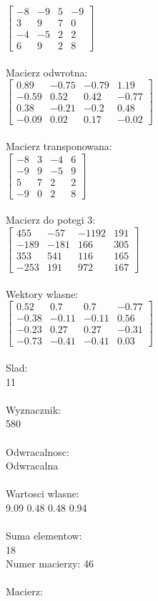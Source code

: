\documentclass[a4paper,12pt]{article}
\begin{document}
$\begin{bmatrix} -8&-9&5&-9\\3&9&7&0\\-4&-5&2&2\\6&9&2&8 \end{bmatrix}$
\\
\\
Macierz odwrotna:\\

$\begin{bmatrix} 0.89&-0.75&-0.79&1.19\\-0.59&0.52&0.42&-0.77\\0.38&-0.21&-0.2&0.48\\-0.09&0.02&0.17&-0.02 \end{bmatrix}$
\\
\\
Macierz transponowana:\\

$\begin{bmatrix} -8&3&-4&6\\-9&9&-5&9\\5&7&2&2\\-9&0&2&8 \end{bmatrix}$
\\
\\
Macierz do potegi 3:\\

$\begin{bmatrix} 455&-57&-1192&191\\-189&-181&166&305\\353&541&116&165\\-253&191&972&167 \end{bmatrix}$
\\
\\
Wektory wlasne:\\

$\begin{bmatrix} 0.52&0.7&0.7&-0.77\\-0.38&-0.11&-0.11&0.56\\-0.23&0.27&0.27&-0.31\\-0.73&-0.41&-0.41&0.03 \end{bmatrix}$
\\
\\
Slad:\\
11
\\
\\
Wyznacznik:\\
580
\\
\\
Odwracalnosc:\\
Odwracalna
\\
\\
Wartosci wlasne:\\
9.09 0.48 0.48 0.94
\\
\\
Suma elementow:\\
18
\\
\newpage
Numer macierzy:
46
\\
\\
Macierz:\\
\end{document}
